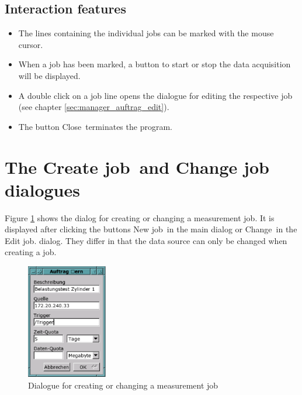 \documentclass[a4paper,12pt,BCOR6mm,bibtotoc,idxtotoc]{scrbook}
\begin{document}

\subsection{Interaction features}

\begin{itemize} 
\item The lines containing the individual jobs can be marked with the mouse cursor. 
\item When a job has been marked, a button to start or stop the data acquisition will be displayed. 
\item A double click on a job line opens the dialogue for editing the respective job (see chapter \ref{sec:manager_auftrag_edit}). 
\item The button \glqq Close\grqq\ terminates the program. \end{itemize}


\section{The \glqq Create job\grqq\  and \glqq Change job dialogues\grqq} \label{sec:manager_auftrag_create}

Figure \ref{fig:dls_ctl_change} shows the dialog for creating or changing a measurement job. It is displayed after clicking the buttons \glqq New job\grqq\ in the main dialog or \glqq Change\grqq\ in the \glqq Edit job\grqq.  dialog. They differ in that the data source can only be changed when creating a job.

\begin{figure}[tbh] \begin{center} \includegraphics[width=100pt]{bilder/ctl_change} \end{center} \caption{Dialogue for creating or changing a measurement job} \label{fig:dls_ctl_change} \end{figure}
\end{document}
